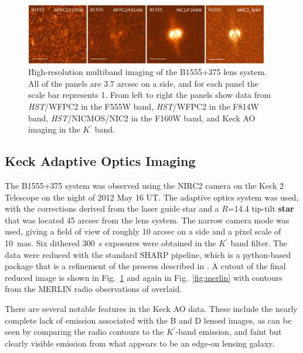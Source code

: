 \documentclass[useAMS,usenatbib]{mnras}
\begin{document}
\begin{figure}
\includegraphics[width=0.95\textwidth]{B1555_gallery.eps}
\caption{High-resolution multiband imaging of the B1555+375 lens system.
All of the panels are 3.7 arcsec on a side, and for each panel the scale bar 
represents 1\arcsec.  From left to right the panels show data from
\textit{HST}/WFPC2 in the F555W band, \textit{HST}/WFPC2 in the F814W band, \textit{HST}/NICMOS/NIC2
in the F160W band, and Keck AO imaging in the $K^\prime$ band.
\label{fig:multiband}}
%

\end{figure}

\subsection{Keck Adaptive Optics Imaging}

The B1555+375 system was observed using the NIRC2 camera on the Keck 2
Telescope on the night of 2012 May 16 UT.  The adaptive optics system
was used, with the corrections derived from the laser guide star and a
$R$=14.4 tip-tilt \textbf{star} that was located 45 arcsec from the lens
system.  The narrow camera mode was used, giving a field of view
of roughly 10 arcsec on a side and a pixel scale of 10~mas.
Six dithered 300~s exposures were obtained in the $K^{\prime}$ band filter.  The
data were reduced with the standard SHARP pipeline, which is a
python-based package that is a refinement of the process described in
\citet{Auger_EELS1}.  A cutout of the final reduced image is shown in
Fig.~\ref{fig:multiband} and again in Fig.~\ref{fig:merlin} with
contours from the MERLIN radio observations of \citet{Marlow99}
overlaid.  

There are several notable features in the Keck AO data.
These include the nearly complete lack of emission associated with the
B and D lensed images, as can be seen by comparing the radio contours
to the $K^\prime$-band emission, and faint but clearly visible
emission from what appears to be an edge-on lensing galaxy.
\end{document}
